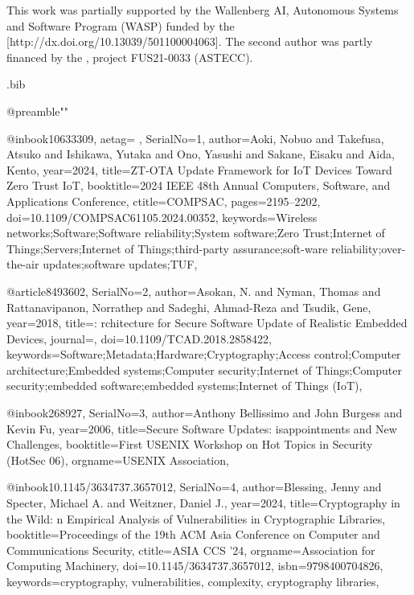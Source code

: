 \documentclass[fleqn,s1,names,tex]{neptune}
\begin{document}
\ackheads
 

This work was partially supported by the Wallenberg AI, \ubrk  Autonomous Systems and Software Program (WASP) funded by the [http://dx.doi.org/10.13039/501100004063].
The second author was partly financed by the , project FUS21-0033 (ASTECC).
\back{}



\nocite{*}



\begin{bibwrite}{\jobname.bib}

@preamble{""}

@inbook{10633309,
aetag={ \advance\baselineskip0.7pt},
SerialNo={1},
author={Aoki, Nobuo and Takefusa, Atsuko and Ishikawa, Yutaka and Ono, Yasushi
  and Sakane, Eisaku and Aida, Kento},
 year={2024},
title={{ZT}-{OTA} Update Framework for {IoT} Devices Toward Zero Trust {IoT}},
booktitle={2024 IEEE 48th Annual Computers, Software, and Applications   Conference},
ctitle={COMPSAC},
  pages={2195--2202},
doi={10.1109/COMPSAC61105.2024.00352},
 keywords={Wireless networks;Software;Software reliability;System software;Zero
  Trust;Internet of Things;Servers;Internet of Things;third-party
  assurance;soft-ware reliability;over-the-air updates;software updates;TUF},
}


@article{8493602,
SerialNo={2},
author={Asokan, N. and Nyman, Thomas and Rattanavipanon, Norrathep and
  Sadeghi, Ahmad-Reza and Tsudik, Gene},
 year={2018},
title={{}: rchitecture for Secure Software Update of Realistic Embedded
  Devices},
journal={\rvtiopIEEETransComputAidedDesIntegrCircuitsSyst},
doi={10.1109/TCAD.2018.2858422},
 keywords={Software;Metadata;Hardware;Cryptography;Access control;Computer
  architecture;Embedded systems;Computer security;Internet of Things;Computer
  security;embedded software;embedded systems;Internet of Things (IoT)},
}


@inbook{268927,
SerialNo={3},
author={Anthony Bellissimo and John Burgess and Kevin Fu},
 year={2006},
title={Secure Software Updates: isappointments and New Challenges},
booktitle={First USENIX Workshop on Hot Topics in Security (HotSec 06)},
 orgname={USENIX Association},
}


@inbook{10.1145/3634737.3657012,
SerialNo={4},
author={Blessing, Jenny and Specter, Michael A. and Weitzner, Daniel J.},
 year={2024},
title={Cryptography in the Wild: n Empirical Analysis of Vulnerabilities in
  Cryptographic Libraries},
booktitle={Proceedings of the 19th ACM Asia Conference on Computer and   Communications Security},
ctitle={ASIA CCS '24},
 orgname={Association for Computing Machinery},
doi={10.1145/3634737.3657012},
 isbn={9798400704826},
 keywords={cryptography, vulnerabilities, complexity, cryptography libraries},
}



\end{bibwrite}
\end{document}
